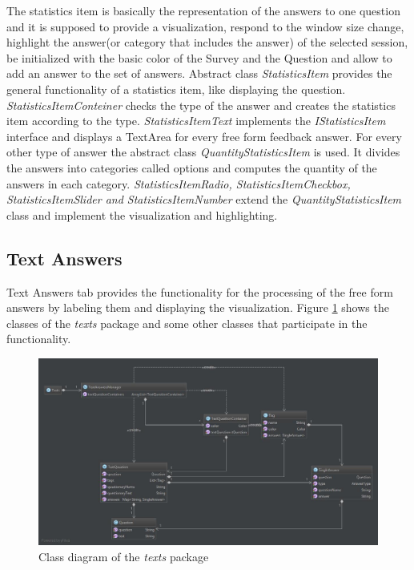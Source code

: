 The statistics item is basically the representation of the answers to one question and it is supposed to provide a visualization, respond to the window size change, highlight the answer(or category that includes the answer) of the selected session, be initialized with the basic color of the Survey and the Question and allow to add an answer to the set of answers. Abstract class \textit{StatisticsItem} provides the general functionality of a statistics item, like displaying the question. \\

\textit{StatisticsItemConteiner} checks the type of the answer and creates the statistics item according to the type. \textit{StatisticsItemText} implements the \textit{IStatisticsItem} interface and displays a TextArea for every free form feedback answer. For every other type of answer the abstract class \textit{QuantityStatisticsItem} is used. It divides the answers into categories called options and computes the quantity of the answers in each category. \textit{StatisticsItemRadio, StatisticsItemCheckbox, StatisticsItemSlider and StatisticsItemNumber} extend the \textit{QuantityStatisticsItem} class and implement the visualization and highlighting.\\

\subsection{Text Answers}
Text Answers tab provides the functionality for the processing of the free form answers by labeling them and displaying the visualization. Figure \ref{fig:d4} shows the classes of the \textit{texts} package and some other classes that participate in the functionality.\\

\begin{figure}[htb]
 \centering
\includegraphics[width=\textwidth]{figures/diagram4.jpg}
\caption{Class diagram of the \textit{texts} package}
\label{fig:d4}
\end{figure}

